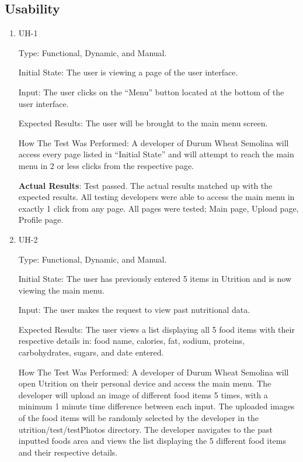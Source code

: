 \documentclass[12pt, titlepage]{article}
\begin{document}
	\subsection{Usability}
	\begin{enumerate}
		
		\item{UH-1}
		
		Type: Functional, Dynamic, and Manual.
		
		Initial State: The user is viewing a page of the user interface.
		
		Input: The user clicks on the “Menu” button located at the bottom of the user interface.
		
		Expected Results: The user will be brought to the main menu screen.
		
		How The Test Was Performed: A developer of Durum Wheat Semolina will access every page listed in “Initial State” and will attempt to reach the main menu in 2 or less clicks from the respective page.
		
		\textbf{Actual Results}: Test passed. The actual results matched up with the expected results. All testing developers were able to access the main menu in exactly 1 click from any page. All pages were tested; Main page, Upload page, Profile page.
		
		
		\item{UH-2}
		
		Type: Functional, Dynamic, and Manual.
		
		Initial State: The user has previously entered 5 items in Utrition and is now viewing the main menu.
		
		Input: The user makes the request to view past nutritional data.
		
		Expected Results: The user views a list displaying all 5 food items with their respective details in: food name, calories, fat, sodium, proteins, carbohydrates, sugars, and date entered.
		
		How The Test Was Performed: A developer of Durum Wheat Semolina will open Utrition on their personal device and access the main menu. The developer will upload an image of different food items 5 times, with a minimum 1 minute time difference between each input. The uploaded images of the food items will be randomly selected by the developer in the utrition/test/testPhotos directory. The developer navigates to the past inputted foods area and views the list displaying the 5 different food items and their respective details.
		

\end{enumerate}
\end{document}
